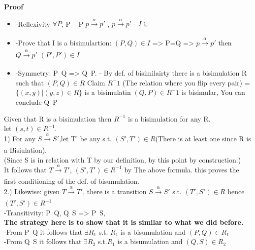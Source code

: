 \documentclass[a4paper,10pt,titlepage]{report}
\begin{document}
\textbf{Proof} \\
\begin{itemize}


\item	-Reflexivity $\forall P$, P ~ P $p \xrightarrow[\text{}]{{ {\alpha} }} p'$ , $p \xrightarrow[\text{}]{{ {\alpha} }} p'$
		-	$I \subseteq ~$
\item		-Prove that I is a bisimulartion: $(P,Q) \in I$ => P=Q => $p \xrightarrow[\text{}]{{ {\alpha} }} p'$ then $Q \xrightarrow[\text{}]{{ {\alpha} }} p'$  $(P',P') \in I $
		
\item	-Symmetry:
		P~Q => Q~P.
			- By def. of bisimilairty there is a bisimulation R such that $(P,Q) \in R$
				Claim $R^-1$ (The relation where you flip every pair) = $\{(x,y)|(y,z) \in R\}$ is a bisimulatin
					$(Q,P) \in R^-1$ is bisimular, You can conclude Q~P
					
\end{itemize}
Given that R is a bisimulation then $R^{-1}$ is a bisimulation for any R.\\
let $(s,t) \in R^{-1}$. \\
1) For any $S \xrightarrow[\text{}]{{ {\alpha} }} S'$,let T' be any s.t. $(S',T') \in R $(There is at least one since R is a Bisiulation).\\
\hspace{5mm}	(Since S is in relation with T by our definition, by this point by construction.)\\
\hspace{5mm}	It follows that $T \xrightarrow[\text{}]{{ {\alpha} }} T'$, $(S',T') \in R^{-1}$ by The above formula. this proves the first conditioning of the def. of bisumulation. \\

2.) Likewise: given $T \xrightarrow[\text{}]{{ {\alpha} }} T'$, there is a transition $S \xrightarrow[\text{}]{{ {\alpha} }} S'$ s.t. $(T', S') \in R$ hence $(T', S') \in R^{-1}$\\

-Transitivity: P~Q, Q~S => P~S, \\
\hspace{5mm}	\textbf{The strategy here is to show that it is similar to what we did before.}\\
\hspace{5mm}	-From P~Q it follows that $\exists R_1$ s.t. $R_1$ is a bisumulation and $(P,Q) \in R_1$\\
\hspace{5mm}	-From Q~S it follows that $\exists R_2$ s.t.$ R_1$ is a bisumulation and $(Q,S) \in R_2$\\
\end{document}
